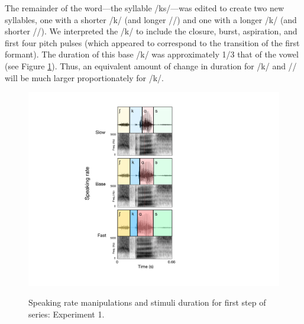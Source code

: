 The remainder of the word---the syllable /k\textscripta s/---was edited to create two new syllables, one with a shorter /k/ (and longer /\textscripta/) and one with a longer /k/ (and shorter /\textscripta/). We interpreted the /k/ to include the closure, burst, aspiration, and first four pitch pulses (which appeared to correspond to the transition of the first formant). The duration of this base /k/ was approximately 1/3 that of the vowel (see Figure \ref{fig:schema-exp1}). Thus, an equivalent amount of change in duration for /k/ and /\textscripta/ will be much larger proportionately for /k/. 

\begin{figure}
\centering
\includegraphics[scale=.75]{figures/stimuli_schema.pdf}
\caption{\label{fig:schema-exp1}} Speaking rate manipulations and stimuli duration for first step of series: Experiment 1. 
\end{figure}

